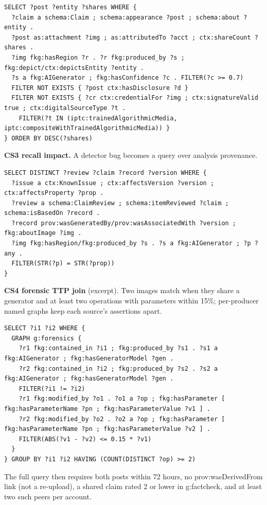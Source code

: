 \documentclass[11pt]{article}
\begin{document}
\begin{lstlisting}[style=sparql]
SELECT ?post ?entity ?shares WHERE {
  ?claim a schema:Claim ; schema:appearance ?post ; schema:about ?entity .
  ?post as:attachment ?img ; as:attributedTo ?acct ; ctx:shareCount ?shares .
  ?img fkg:hasRegion ?r . ?r fkg:produced_by ?s ; fkg:depict/ctx:depictsEntity ?entity .
  ?s a fkg:AIGenerator ; fkg:hasConfidence ?c . FILTER(?c >= 0.7)
  FILTER NOT EXISTS { ?post ctx:hasDisclosure ?d }
  FILTER NOT EXISTS { ?cr ctx:credentialFor ?img ; ctx:signatureValid true ; ctx:digitalSourceType ?t .
    FILTER(?t IN (iptc:trainedAlgorithmicMedia, iptc:compositeWithTrainedAlgorithmicMedia)) }
} ORDER BY DESC(?shares)
\end{lstlisting}
\textbf{CS3 recall impact.} A detector bug becomes a query over analysis provenance.

\begin{lstlisting}[style=sparql]
SELECT DISTINCT ?review ?claim ?record ?version WHERE {
  ?issue a ctx:KnownIssue ; ctx:affectsVersion ?version ; ctx:affectsProperty ?prop .
  ?review a schema:ClaimReview ; schema:itemReviewed ?claim ; schema:isBasedOn ?record .
  ?record prov:wasGeneratedBy/prov:wasAssociatedWith ?version ; fkg:aboutImage ?img .
  ?img fkg:hasRegion/fkg:produced_by ?s . ?s a fkg:AIGenerator ; ?p ?any .
  FILTER(STR(?p) = STR(?prop))
}
\end{lstlisting}
\textbf{CS4 forensic TTP join} (excerpt). Two images match when they share a generator and at least two operations with parameters within 15\%; per-producer named graphs keep each source's assertions apart.

\begin{lstlisting}[style=sparql]
SELECT ?i1 ?i2 WHERE {
  GRAPH g:forensics {
    ?r1 fkg:contained_in ?i1 ; fkg:produced_by ?s1 . ?s1 a fkg:AIGenerator ; fkg:hasGeneratorModel ?gen .
    ?r2 fkg:contained_in ?i2 ; fkg:produced_by ?s2 . ?s2 a fkg:AIGenerator ; fkg:hasGeneratorModel ?gen .
    FILTER(?i1 != ?i2)
    ?r1 fkg:modified_by ?o1 . ?o1 a ?op ; fkg:hasParameter [ fkg:hasParameterName ?pn ; fkg:hasParameterValue ?v1 ] .
    ?r2 fkg:modified_by ?o2 . ?o2 a ?op ; fkg:hasParameter [ fkg:hasParameterName ?pn ; fkg:hasParameterValue ?v2 ] .
    FILTER(ABS(?v1 - ?v2) <= 0.15 * ?v1)
  }
} GROUP BY ?i1 ?i2 HAVING (COUNT(DISTINCT ?op) >= 2)
\end{lstlisting}
The full query then requires both posts within 72 hours, no prov:wasDerivedFrom link (not a re-upload), a shared claim rated 2 or lower in g:factcheck, and at least two such peers per account.
\end{document}
